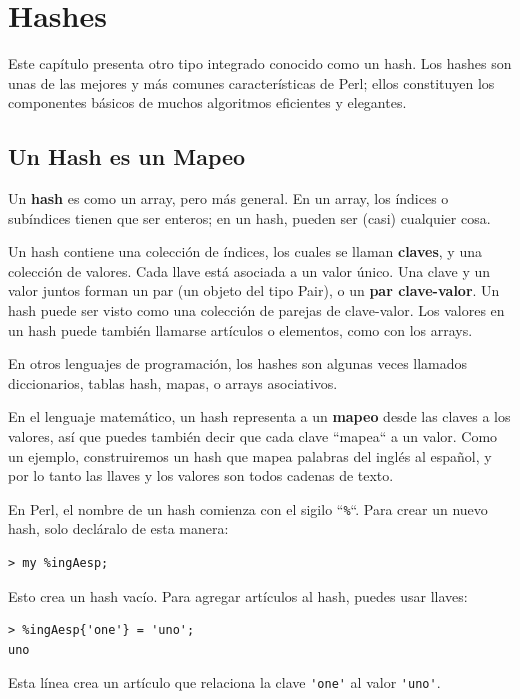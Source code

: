 
\chapter{Hashes}
\label{hashes}

Este capítulo presenta otro tipo integrado conocido como un
hash. Los hashes son unas de las mejores y más comunes 
características de Perl; ellos constituyen los componentes básicos
de muchos algoritmos eficientes y elegantes.

\section{Un Hash es un Mapeo}
\label{hash_descr}

Un {\bf hash} es como un array, pero más general. En un array,
los índices o subíndices tienen que ser enteros; en un hash,
pueden ser (casi) cualquier cosa.

Un hash contiene una colección de índices, los cuales se llaman
{\bf claves}, y una colección de valores. 
Cada llave está asociada a un valor único. Una clave y un valor
juntos forman un par (un objeto del tipo Pair), o un {\bf par
clave-valor}. Un hash puede ser visto como una colección de parejas de
clave-valor. Los valores en un hash puede también llamarse artículos o 
elementos, como con los arrays.

En otros lenguajes de programación, los hashes son algunas veces
llamados diccionarios, tablas hash, mapas, o arrays asociativos.

En el lenguaje matemático, un hash representa a un {\bf mapeo}
desde las claves a los valores, así que puedes también decir que cada
clave ``mapea`` a un valor. Como un ejemplo, construiremos un hash
que mapea palabras del inglés al español, y por lo tanto las llaves y
los valores son todos cadenas de texto.

En Perl, el nombre de un hash comienza con el sigilo ``\verb|%|``. Para
crear un nuevo hash, solo decláralo de esta manera:

\begin{lstlisting}
> my %ingAesp;
\end{lstlisting}

Esto crea un hash vacío. Para agregar artículos al hash,
puedes usar llaves:

\begin{lstlisting}
> %ingAesp{'one'} = 'uno';
uno
\end{lstlisting}
%
Esta línea crea un artículo que relaciona la clave
\verb"'one'" al valor \verb"'uno'".  

